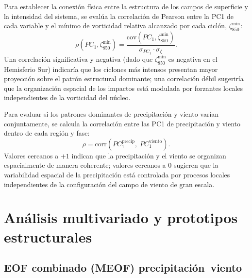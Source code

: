 Para establecer la conexión física entre la estructura de los campos de superficie y la intensidad del sistema, se evalúa la correlación de Pearson entre la PC1 de cada variable y el mínimo de vorticidad relativa alcanzado por cada ciclón, $\zeta_{850}^{\min}$:
\begin{equation}
    \rho\!\left(PC_1, \zeta_{850}^{\min}\right) = \frac{\text{cov}\!\left(PC_1, \zeta_{850}^{\min}\right)}{\sigma_{PC_1} \cdot \sigma_{\zeta}}.
\end{equation}
Una correlación significativa y negativa (dado que $\zeta_{850}^{\min}$ es negativa en el Hemisferio Sur) indicaría que los ciclones más intensos presentan mayor proyección sobre el patrón estructural dominante; una correlación débil sugeriría que la organización espacial de los impactos está modulada por forzantes locales independientes de la vorticidad del núcleo.

Para evaluar si los patrones dominantes de precipitación y viento varían conjuntamente, se calcula la correlación entre las PC1 de precipitación y viento dentro de cada región y fase:
\begin{equation}
    \rho = \text{corr}\!\left(PC_1^{\text{precip}},\; PC_1^{\text{viento}}\right).
\end{equation}
Valores cercanos a $+1$ indican que la precipitación y el viento se organizan espacialmente de manera coherente; valores cercanos a $0$ sugieren que la variabilidad espacial de la precipitación está controlada por procesos locales independientes de la configuración del campo de viento de gran escala.


\section{Análisis multivariado y prototipos estructurales}\label{sec:meof_prototipos}

\subsection{EOF combinado (MEOF) precipitación--viento}\label{subsec:eof_multivariado}

